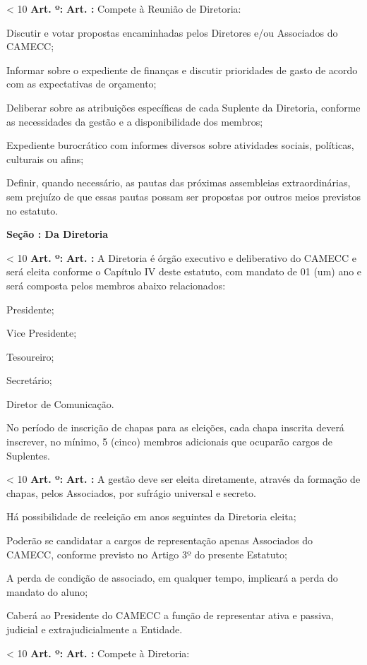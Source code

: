\documentclass[capitulo]{br-lex}
\newcounter{chap}
\newcounter{sec}
\newcounter{art}
\newcommand{\secao}[1]{
    \vspace{20pt}
    \textbf{Seção \Roman{sec}: #1}
    \stepcounter{sec}
}
\renewcommand{\artigo}{
    \ifnum\value{art} < 10
        \textbf{Art. \arabic{art}º:}
    \else
        \textbf{Art. \arabic{art}:}
    \fi
    \stepcounter{art}
    \setcounter{inciso}{0}
    \setcounter{paragrafo}{0}
}
\begin{document}
\artigo Compete à Reunião de Diretoria:

\inciso Discutir e votar propostas encaminhadas pelos Diretores e/ou Associados do CAMECC;

\inciso Informar sobre o expediente de finanças e discutir prioridades de gasto de acordo com as expectativas de orçamento;

\inciso Deliberar sobre as atribuições específicas de cada Suplente da Diretoria, conforme as necessidades da gestão e a disponibilidade dos membros;

\inciso Expediente burocrático com informes diversos sobre atividades sociais, políticas, culturais ou afins;

\inciso Definir, quando necessário, as pautas das próximas assembleias extraordinárias, sem prejuízo de que essas pautas possam ser propostas por outros meios previstos no estatuto.

\secao{Da Diretoria}

\artigo A Diretoria é órgão executivo e deliberativo do CAMECC e será eleita conforme o Capítulo IV deste estatuto, com mandato de 01 (um) ano e será composta pelos membros abaixo relacionados:

\inciso Presidente;

\inciso Vice Presidente;

\inciso Tesoureiro;

\inciso Secretário;

\inciso Diretor de Comunicação.

\paragrafounico No período de inscrição de chapas para as eleições, cada chapa inscrita deverá inscrever, no mínimo, 5 (cinco) membros adicionais que ocuparão cargos de Suplentes.

\artigo A gestão deve ser eleita diretamente, através da formação de chapas, pelos Associados, por sufrágio universal e secreto.

\paragrafo Há possibilidade de reeleição em anos seguintes da Diretoria eleita;

\paragrafo Poderão se candidatar a cargos de representação apenas Associados do CAMECC, conforme previsto no Artigo 3º do presente Estatuto;

\paragrafo A perda de condição de associado, em qualquer tempo, implicará a perda do mandato do aluno;

\paragrafo Caberá ao Presidente do CAMECC a função de representar ativa e passiva, judicial e extrajudicialmente a Entidade.

\artigo Compete à Diretoria:
\end{document}
